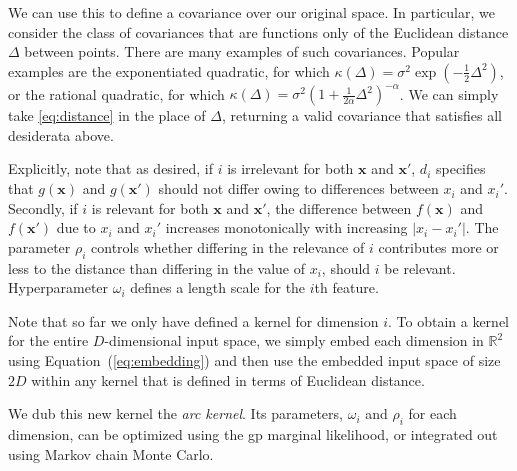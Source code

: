 \documentclass{article}
\renewcommand{\vec}[1]{\mathbf{#1}}
\newcommand{\br}{}%
\newcommand{\note}[1]{}
\newcommand{\gp}{{\sc gp}}
\begin{document}
We can use this to define a covariance over our original space. In particular, we consider the class of covariances that are functions only of the Euclidean distance $\Delta$ between points.
There are many examples of such covariances.
Popular examples are the exponentiated quadratic, for which $\kappa(\Delta) = \sigma^2 \exp(-\frac{1}{2} \Delta^2)$, or the rational quadratic, for which $\kappa(\Delta) = \sigma^2 (1+\frac{1}{2\alpha} \Delta^2)^{-\alpha}$.
We can simply take \eqref{eq:distance} in the place of $\Delta$, returning a valid covariance that satisfies all desiderata above. 

Explicitly, note that as desired, if $i$ is irrelevant for both $\vec{x}$ and $\vec{x}'$, $d\br_i$ specifies that $g(\vec{x})$ and $g(\vec{x}')$ should not differ owing to differences between $x_i$ and $x_i'$. Secondly, if $i$ is relevant for both $\vec{x}$ and $\vec{x}'$, the difference between $f(\vec{x})$ and $f(\vec{x}')$ due to $x_i$ and $x_i'$ increases monotonically with increasing $\left|x_i-x_i'\right|$. The parameter $\rho_i$ controls whether differing in the relevance of $i$ contributes more or less to the distance than differing in the value of $x_i$, should $i$ be relevant. 
%
%
%
%
Hyperparameter $\omega_i$ defines a length scale for the $i$th feature. 

Note that so far we only have defined a kernel for dimension $i$.
To obtain a kernel for the entire $D$-dimensional input space, we simply embed each dimension in $\mathbb{R}^2$ using Equation~(\ref{eq:embedding}) and then use the embedded input space of size $2D$ within any kernel that is defined in terms of Euclidean distance.
\note{DD:This isn't quite accurate anymore, right Kev?}
We dub this new kernel the \emph{arc kernel}.
Its parameters, $\omega_i$ and $\rho_i$ for each dimension, can be optimized using the \gp{} marginal likelihood, or integrated out using Markov chain Monte Carlo.
\end{document}
